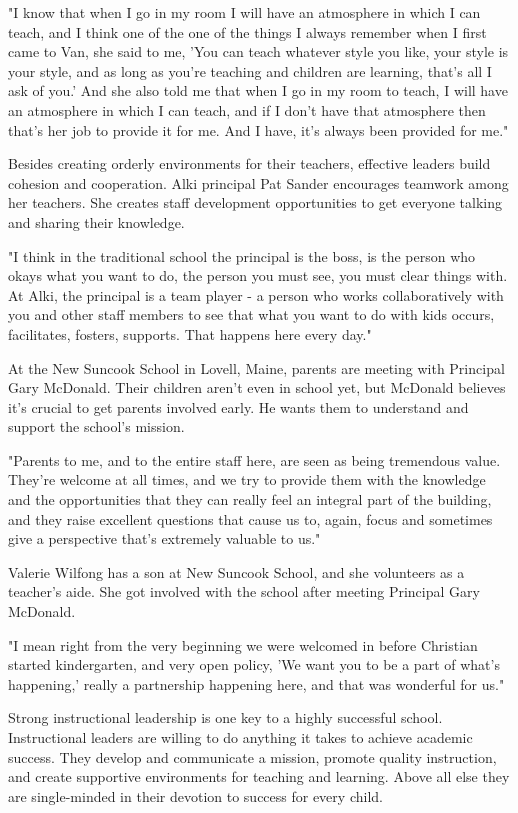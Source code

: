 "I know that when I go in my room I will have an atmosphere in which I can teach, and I think one of the one of the things I always remember when I first came to Van, she said to me, 'You can teach whatever style you like, your style is your style, and as long as you're teaching and children are learning, that's all I ask of you.' And she also told me that when I go in my room to teach, I will have an atmosphere in which I can teach, and if I don't have that atmosphere then that's her job to provide it for me. And I have, it's always been provided for me."

Besides creating orderly environments for their teachers, effective leaders build cohesion and cooperation. Alki principal Pat Sander encourages teamwork among her teachers. She creates staff development opportunities to get everyone talking and sharing their knowledge.

"I think in the traditional school the principal is the boss, is the person who okays what you want to do, the person you must see, you must clear things with. At Alki, the principal is a team player - a person who works collaboratively with you and other staff members to see that what you want to do with kids occurs, facilitates, fosters, supports. That happens here every day."

At the New Suncook School in Lovell, Maine, parents are meeting with Principal Gary McDonald. Their children aren't even in school yet, but McDonald believes it's crucial to get parents involved early. He wants them to understand and support the school's mission.

"Parents to me, and to the entire staff here, are seen as being tremendous value. They're welcome at all times, and we try to provide them with the knowledge and the opportunities that they can really feel an integral part of the building, and they raise excellent questions that cause us to, again, focus and sometimes give a perspective that's extremely valuable to us."

Valerie Wilfong has a son at New Suncook School, and she volunteers as a teacher's aide. She got involved with the school after meeting Principal Gary McDonald.

"I mean right from the very beginning we were welcomed in before Christian started kindergarten, and very open policy, 'We want you to be a part of what's happening,' really a partnership happening here, and that was wonderful for us."

Strong instructional leadership is one key to a highly successful school. Instructional leaders are willing to do anything it takes to achieve academic success. They develop and communicate a mission, promote quality instruction, and create supportive environments for teaching and learning. Above all else they are single-minded in their devotion to success for every child.


